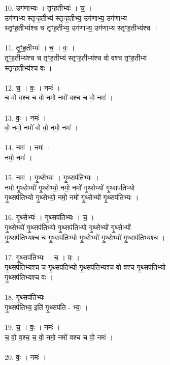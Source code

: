 10. उग॑णाभ्यः । तृ॒ꣳ॒ह॒तीभ्यः॑ । च॒ ।\\
उग॑णाभ्य स्तृꣳह॒तीभ्य॑ स्तृꣳह॒तीभ्य॒ उग॑णाभ्य॒ उग॑णाभ्य\\
स्तृꣳह॒तीभ्य॑श्च च तृꣳह॒तीभ्य॒ उग॑णाभ्य॒ उग॑णाभ्य स्तृꣳह॒तीभ्य॑श्च ।\\
\\
11. तृ॒ꣳ॒ह॒तीभ्यः॑ । च॒ । वः॒ ।\\
तृ॒ꣳ॒ह॒तीभ्य॑श्च च तृꣳह॒तीभ्य॑ स्तृꣳह॒तीभ्य॑श्च वो वश्च तृꣳह॒तीभ्य॑\\
स्तृꣳह॒तीभ्य॑श्च वः ।\\
\\
12. च॒ । वः॒ । नमः॑ ।\\
च॒ वो॒ व॒श्च॒ च॒ वो॒ नमो॒ नमो॑ वश्च च वो॒ नमः॑ ।\\
\\
13. वः॒ । नमः॑ ।\\
वो॒ नमो॒ नमो॑ वो वो॒ नमो॒ नमः॑ ।\\
\\
14. नमः॑ । नमः॑ ।\\
नमो॒ नमः॑ ।\\
\\
15. नमः॑ । गृ॒थ्सेभ्यः॑ । गृ॒थ्सप॑तिभ्यः ।\\
नमो॑ गृ॒थ्सेभ्यो॑ गृ॒थ्सेभ्यो॒ नमो॒ नमो॑ गृ॒थ्सेभ्यो॑ गृ॒थ्सप॑तिभ्यो\\
गृ॒थ्सप॑तिभ्यो गृ॒थ्सेभ्यो॒ नमो॒ नमो॑ गृ॒थ्सेभ्यो॑ गृ॒थ्सप॑तिभ्यः ।\\
\\
16. गृ॒थ्सेभ्यः॑ । गृ॒थ्सप॑तिभ्यः । च॒ ।\\
गृ॒थ्सेभ्यो॑ गृ॒थ्सप॑तिभ्यो गृ॒थ्सप॑तिभ्यो गृ॒थ्सेभ्यो॑ गृ॒थ्सेभ्यो॑\\
गृ॒थ्सप॑तिभ्यश्च च गृ॒थ्सप॑तिभ्यो गृ॒थ्सेभ्यो॑ गृ॒थ्सेभ्यो॑ गृ॒थ्सप॑तिभ्यश्च ।\\
\\
17. गृ॒थ्सप॑तिभ्यः । च॒ । वः॒ ।\\
गृ॒थ्सप॑तिभ्यश्च च गृ॒थ्सप॑तिभ्यो गृ॒थ्सप॑तिभ्यश्च वो वश्च गृ॒थ्सप॑तिभ्यो\\
गृ॒थ्सप॑तिभ्यश्च वः ।\\
\\
18. गृ॒थ्सप॑तिभ्यः ।\\
गृ॒थ्सप॑तिभ्य॒ इति॑ गृ॒थ्सप॑ति - भ्यः॒ ।\\
\\
19. च॒ । वः॒ । नमः॑ ।\\
च॒ वो॒ व॒श्च॒ च॒ वो॒ नमो॒ नमो॑ वश्च च वो॒ नमः॑ ।\\
\\
20. वः॒ । नमः॑ ।\\
